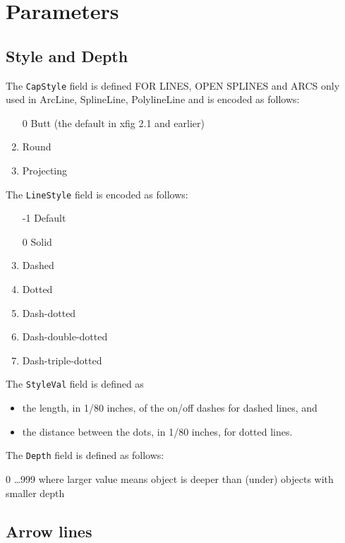 \documentclass[10pt, a4paper]{article}%
\begin{document}
\section{Parameters}\label{sec:param}

\subsection{Style and Depth}\label{subsec:styDep}

The \texttt{CapStyle} field is defined FOR LINES, OPEN SPLINES and ARCS only 
used in ArcLine, SplineLine, PolylineLine
and is encoded as follows:
%
\begin{enumerate}
\item[0] Butt (the default in xfig 2.1 and earlier)
\item    Round
\item    Projecting
\end{enumerate}

\noindent
The \texttt{LineStyle} field is encoded as follows:
%
\begin{enumerate}
\item[-1] Default
\item[0]  Solid
\item     Dashed
\item     Dotted
\item     Dash-dotted
\item     Dash-double-dotted
\item     Dash-triple-dotted
\end{enumerate}

\noindent
The \texttt{StyleVal} field is defined as 
%
\begin{itemize}
\item
the length, in 1/80 inches, of the on/off dashes for dashed lines, and 
\item
the distance between the dots, in 1/80 inches, for dotted lines.
\end{itemize}

\noindent
The \texttt{Depth} field is defined as follows:

         0 \ldots 999 where larger value means object is deeper than (under)
                   objects with smaller depth

\subsection{Arrow lines}\label{subsec:paramArrowLines}
\end{document}
